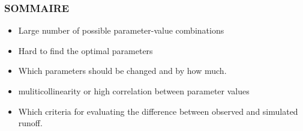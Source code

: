 \documentclass[aspectratio=169,professionalfonts, 12pt, t]{beamer}
\begin{document}
	\begin{frame}
	\titlepage
	\end{frame}
\begin{frame}
\frametitle{SOMMAIRE}
\tableofcontents
\end{frame}

	
	
	
	


\begin{frame}
\begin{itemize}[<+->]
	\transdissolve
	\item Large number of possible parameter-value combinations
	\item Hard to find the optimal parameters
	\item Which parameters should be changed and by how much. 
	\item muliticollinearity or high correlation between parameter values
	\item Which criteria for evaluating the difference between observed and 
	simulated runoff.
\end{itemize}
{\tiny }\end{frame}

%
\end{document}
